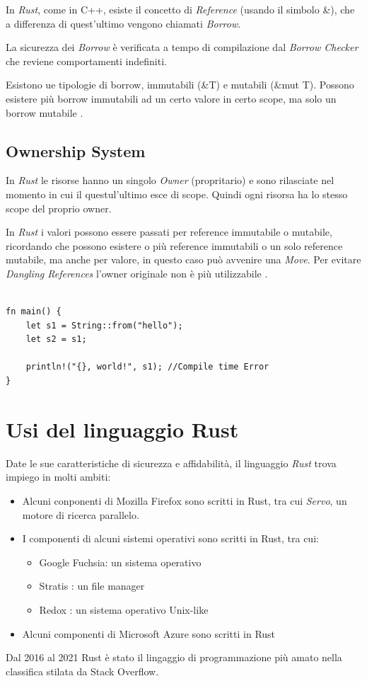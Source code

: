 In \textit{Rust}, come in C++, esiste il concetto di \textit{Reference} (usando il simbolo \&), che a differenza di quest'ultimo vengono chiamati \textit{Borrow}. 

La sicurezza dei \textit{Borrow} è verificata a tempo di compilazione dal \textit{Borrow Checker} che reviene comportamenti indefiniti.

Esistono ue tipologie di borrow, immutabili (\&T) e mutabili (\&mut T). Possono esistere più borrow immutabili ad un certo valore in certo scope, ma solo un borrow mutabile \cite{10.5555/3271463}.

\subsection{Ownership System}
In \textit{Rust} le risorse hanno un singolo \textit{Owner} (propritario) e sono rilasciate nel momento in cui il questul'ultimo esce di scope. Quindi ogni risorsa ha lo stesso scope del proprio owner.

In \textit{Rust} i valori possono essere passati per reference immutabile o mutabile, ricordando che possono esistere o più reference immutabili o un solo reference mutabile, ma anche per valore, in questo caso può avvenire una \textit{Move}. Per evitare \textit{Dangling References} l'owner originale non è più utilizzabile \cite{10.5555/3271463}.\\

\begin{lstlisting}[caption={Esempio di Move. s1 non può più essere utilizzato, il nuovo Owner della stringa è s2.}, captionpos=b]

fn main() {
    let s1 = String::from("hello");
    let s2 = s1;

    println!("{}, world!", s1); //Compile time Error
}
\end{lstlisting}

\section{Usi del linguaggio Rust}
Date le sue caratteristiche di sicurezza e affidabilità, il linguaggio \textit{Rust} trova impiego in molti ambiti:

\begin{itemize}
    \item Alcuni conponenti di Mozilla Firefox sono scritti in Rust, tra cui \textit{Servo}, un motore di ricerca parallelo.
    \item I componenti di alcuni sistemi operativi sono scritti in Rust, tra cui:
    \begin{itemize}
        \item Google Fuchsia: un sistema operativo
        \item Stratis : un file manager
        \item Redox : un sistema operativo Unix-like
    \end{itemize}
    \item Alcuni componenti di Microsoft Azure sono scritti in Rust
\end{itemize}

Dal 2016 al 2021 Rust è stato il lingaggio di programmazione più amato nella classifica stilata da Stack Overflow.









